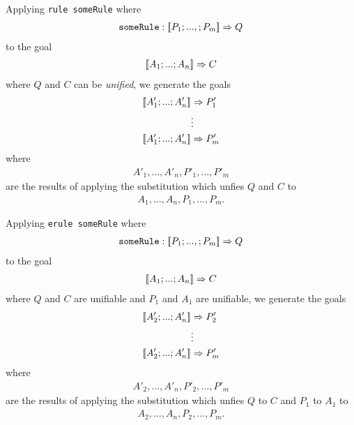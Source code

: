 \documentclass{article}
\begin{document}
\begin{definition}
    Applying \texttt{rule someRule} where
    \begin{align*}
        \texttt{someRule} : [\![P_1;...,;P_m]\!] \Rightarrow Q
    \end{align*}
    to the goal
    \begin{align*}
        [\![A_1; ...; A_n]\!] \Rightarrow C
    \end{align*}
    where $Q$ and $C$ can be \emph{unified}, we generate the goals
    \begin{align*}
        \db{A'_1; ...; A'_n} & \Rightarrow P'_1 \\
                             & \vdots           \\
        \db{A'_1; ...; A'_n} & \Rightarrow P'_m
    \end{align*}
    where \begin{align*}
        A'_1, ..., A'_n,P'_1,...,P'_m
    \end{align*}
    are the results of applying the
    substitution which unfies $Q$ and $C$ to
    \begin{align*}
        A_1,...,A_n,P_1,...,P_m.
    \end{align*}
\end{definition}

\begin{definition}
    Applying \texttt{erule someRule} where
    \begin{align*}
        \texttt{someRule} : [\![P_1;...,;P_m]\!] \Rightarrow Q
    \end{align*}
    to the goal
    \begin{align*}
        [\![A_1; ...; A_n]\!] \Rightarrow C
    \end{align*}
    where $Q$ and $C$ are unifiable and $P_1$ and $A_1$ are unifiable, we generate the goals
    \begin{align*}
        \db{A'_2; ...; A'_n} & \Rightarrow P'_2 \\
                             & \vdots           \\
        \db{A'_2; ...; A'_n} & \Rightarrow P'_m
    \end{align*}
    where \begin{align*}
        A'_2, ..., A'_n,P'_2,...,P'_m
    \end{align*}
    are the results of applying the
    substitution which unfies $Q$ to $C$ and $P_1$ to $A_1$ to
    \begin{align*}
        A_2,...,A_n,P_2,...,P_m.
    \end{align*}
\end{definition}
\end{document}
